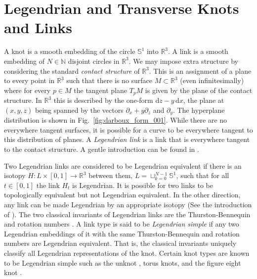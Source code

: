 \section{Legendrian and Transverse Knots and Links}
    A knot is a smooth embedding of the circle $\mathbb{S}^{1}$ into
    $\mathbb{R}^{3}$. A link is a smooth embedding of $N\in\mathbb{N}$
    disjoint circles in $\mathbb{R}^{3}$. We may impose
    extra structure by considering the standard \textit{contact structure}
    of $\mathbb{R}^{3}$. This is an assignment
    of a plane to every point in $\mathbb{R}^{3}$ such that there is no
    surface $M\subset\mathbb{R}^{3}$ (even infinitesimally) where for every
    $p\in{M}$ the tangent
    plane $T_{p}M$ is given by the plane of the contact structure. In
    $\mathbb{R}^{3}$ this is described by the one-form
    $\textrm{d}z-y\,\textrm{d}x$, the plane at $(x,y,z)$ being spanned by
    the vectors $\partial_{x}+y\partial_{z}$ and $\partial_{y}$. The
    hyperplane distribution is shown in Fig.~\ref{fig:darboux_form_001}.
    While there are no everywhere tangent surfaces, it is possible for a
    curve to be everywhere tangent to this distribution of planes.
    A \textit{Legendrian link} is a link that is everywhere tangent to
    the contact structure. A gentle introduction can be found
    in \cite{JoshuaMSabloffWhatIsLegendrianKnot}.
    \par\hfill\par
    Two Legendrian links are considered to be Legendrian equivalent if
    there is an isotopy $H:L\times[0,1]\rightarrow\mathbb{R}^{3}$ between
    them, $L=\sqcup_{k=0}^{N-1}\mathbb{S}^{1}$, such that for all
    $t\in[0,1]$ the link $H_{t}$ is Legendrian. It is possible for two links
    to be topologically equivalent but not Legendrian equivalent. In the other
    direction, any link can be made Legendrian by an appropriate isotopy
    (See the introduction of \cite{VeraVertessiTransNonSimpleKnots}). The
    two classical invariants of Legendrian links are the Thurston-Bennequin
    and rotation numbers \cite{Ding2006LEGENDRIANHA}.
    A link type is said to be \textit{Legendrian simple} if
    any two Legendrian embeddings of it with the same Thurston-Bennequin
    and rotation numbers are Legendrian equivalent. That is, the classical
    invariants uniquely classify all Legendrian representations of the knot.
    Certain knot types are known to be Legendrian simple such as the unknot
    \cite{EliashbergFraserClassificationTopTrivialLegKnots}, torus knots,
    and the figure eight knot \cite{EtnyreHondaContactTopologyI}.
